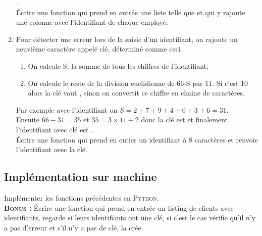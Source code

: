 \documentclass[a4paper,11pt,french]{book}
\begin{document}
\begin{enumerate}[\bfseries 1.]
	.\\	
	Écrire une fonction  qui prend en entrée une liste telle que  et qui y rajoute une colonne avec l’identifiant de chaque employé.
	\item 	Pour détecter une erreur lors de la saisie d'un identifiant, on rajoute un neuvième caractère appelé clé, déterminé comme ceci :
	\begin{enumerate}[--]
		\item 	On calcule S, la somme de tous les chiffres de l'identifiant;
		\item 	On calcule le reste de la division euclidienne de 66-S par 11. Si c'est 10 alors la clé vaut , sinon on convertit ce chiffre en chaine de caractères.
	\end{enumerate}
		Par exemple avec l'identifiant  on $S= 2 + 7 + 9 + 4 + 0 + 3 + 6=31$.\\
	Ensuite $66-31=35$ et $35=3\times 11 + 2$ donc la clé est  et finalement l'identifiant avec clé est .\\
	
	\'Ecrire une fonction  qui prend en entier un identifiant à 8 caractères et renvoie l'identifiant avec la clé.
\end{enumerate}

\subsection{Implémentation sur machine}
	Implémenter les fonctions précédentes en \textsc{Python}.\\
	
	\textbf{\textsc{Bonus} :} \'Ecrire une fonction  qui prend en entrée un listing de clients avec identifiants, regarde si leurs identifiants ont une clé, si c'est le cas vérifie qu'il n'y a pas d'erreur et s'il n'y a pas de clé, la crée.
\end{document}
